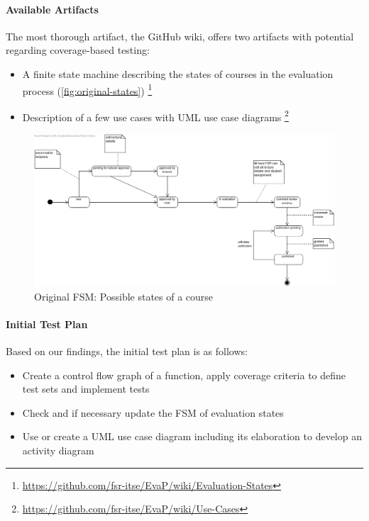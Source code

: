 \paragraph{Available Artifacts}
The most thorough artifact, the GitHub wiki, offers two artifacts with potential regarding coverage-based testing:
\begin{itemize}
    \item A finite state machine describing the states of courses in the evaluation process (\autoref{fig:original-states})%
    \footnote{\url{https://github.com/fsr-itse/EvaP/wiki/Evaluation-States}}
    \item Description of a few use cases with UML use case diagrams%
    \footnote{\url{https://github.com/fsr-itse/EvaP/wiki/Use-Cases}}
\end{itemize}
\begin{figure}[h]
    \centering
    \includegraphics[width=\textwidth, keepaspectratio]{graphics/original_states_of_a_course}
    \caption{Original FSM: Possible states of a course}
    \label{fig:original-states}
\end{figure}

\paragraph{Initial Test Plan}
Based on our findings, the initial test plan is as follows:
\begin{itemize}
    \item Create a control flow graph of a function, apply coverage criteria to define test sets and implement tests
    \item Check and if necessary update the FSM of evaluation states
    \item Use or create a UML use case diagram including its elaboration to develop an activity diagram
\end{itemize}
